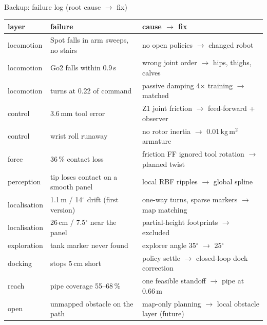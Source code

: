 \documentclass[aspectratio=169,10pt]{beamer}
\begin{document}
\begin{frame}{Backup: failure log (root cause $\rightarrow$ fix)}
\scriptsize\centering
\begin{tabular}{@{}lll@{}}\toprule
layer & failure & cause $\rightarrow$ fix\\\midrule
locomotion & Spot falls in arm sweeps, no stairs & no open policies $\rightarrow$ changed robot\\
locomotion & Go2 falls within 0.9\,s & wrong joint order $\rightarrow$ hips, thighs, calves\\
locomotion & turns at 0.22 of command & passive damping 4$\times$ training $\rightarrow$ matched\\
control & 3.6\,mm tool error & Z1 joint friction $\rightarrow$ feed-forward + observer\\
control & wrist roll runaway & no rotor inertia $\rightarrow$ 0.01\,kg\,m$^2$ armature\\
force & 36\,\% contact loss & friction FF ignored tool rotation $\rightarrow$ planned twist\\
perception & tip loses contact on a smooth panel & local RBF ripples $\rightarrow$ global spline\\
localisation & 1.1\,m / 14$^\circ$ drift (first version) & one-way turns, sparse markers $\rightarrow$ map matching\\
localisation & 26\,cm / 7.5$^\circ$ near the panel & partial-height footprints $\rightarrow$ excluded\\
exploration & tank marker never found & explorer angle 35$^\circ$ $\rightarrow$ 25$^\circ$\\
docking & stops 5\,cm short & policy settle $\rightarrow$ closed-loop dock correction\\
reach & pipe coverage 55--68\,\% & one feasible standoff $\rightarrow$ pipe at 0.66\,m\\
open & unmapped obstacle on the path & map-only planning $\rightarrow$ local obstacle layer (future)\\\bottomrule
\end{tabular}
\end{frame}
\end{document}
